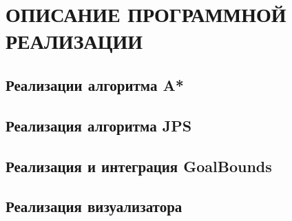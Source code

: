 \section{\MakeTextUppercase{ОПИСАНИЕ ПРОГРАММНОЙ РЕАЛИЗАЦИИ}}

\subsection{Реализации алгоритма A*}

\subsection{Реализация алгоритма JPS}

\subsection{Реализация и интеграция GoalBounds}

\subsection{Реализация визуализатора}
